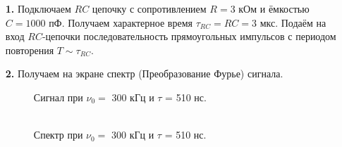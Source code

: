\documentclass[a4paper,12pt]{article} %
\begin{document}
\begin{enumerate}


	\item [\textbf{1.}] Подключаем $RC$ цепочку с сопротивлением $R = 3$ кОм и ёмкостью $C = 1000$ пФ. Получаем характерное время $\tau_{RC} = RC = 3 $ мкс. Подаём на вход $RC$-цепочки последовательность прямоугольных импульсов с периодом повторения $T \sim \tau_{RC}$.


	\item [\textbf{2.}] Получаем на экране спектр (Преобразование Фурье) сигнала.

	      \begin{figure}[h]
		      \begin{minipage}[h]{0.44\linewidth}
			       Сигнал при $\nu_0 = $ 300 кГц и $\tau$ = 510 нс.  \\
		      \end{minipage}
		      \hfill
		      \begin{minipage}[h]{0.44\linewidth}
			       \\  Спектр при $\nu_0 = $ 300 кГц и $\tau$ = 510 нс.

\end{minipage}
\end{figure}
\end{enumerate}
\end{document}
